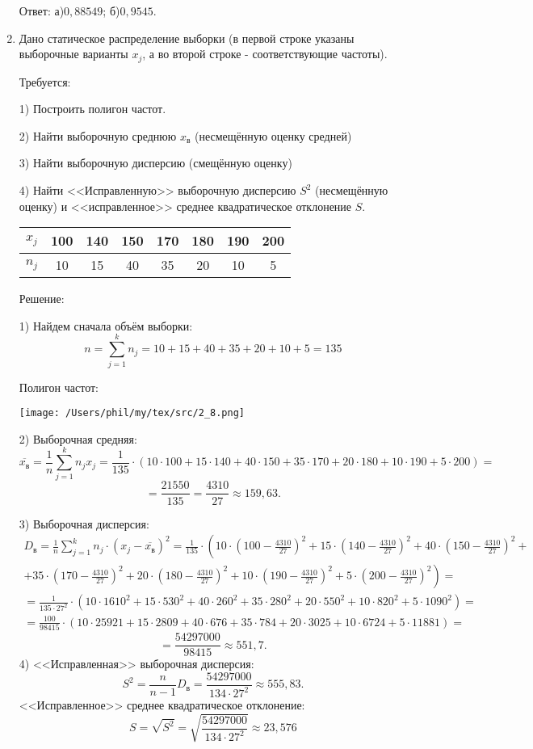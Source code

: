 \documentclass{article}
\begin{document}
\begin{enumerate}
Ответ: а)$0,88549$; б)$0,9545$.

\item %
Дано статическое распределение выборки (в первой строке указаны выборочные варианты $x_j$, а во второй строке - соответствующие частоты).

Требуется:

1) Построить полигон частот.

2) Найти выборочную среднюю $x_\textit{в}$ (несмещённую оценку средней)

3) Найти выборочную дисперсию (смещённую оценку)

4) Найти <<Исправленную>> выборочную дисперсию $S^2$ (несмещённую оценку) и <<исправленное>> среднее квадратическое отклонение $S$.

\begin{center}
\begin{tabular}{|c|c|c|c|c|c|c|c|}
\hline
$x_j$ & 100 & 140 & 150 & 170 & 180 & 190 & 200 \\
\hline
$n_j$ & 10 & 15 & 40 & 35 & 20 & 10 & 5 \\
\hline
\end{tabular}
\end{center}
\begin{center}Решение:\end{center}
1) Найдем сначала объём выборки: $$n=\sum_{j=1}^k n_j=10+15+40+35+20+10+5=135$$

Полигон частот:

\texttt{[image: /Users/phil/my/tex/src/2\_8.png]}

2) Выборочная средняя:
$$\overline{x_\textit{в}}=\frac{1}{n}\sum_{j=1}^k n_j x_j=\frac{1}{135}\cdot\left(10\cdot100+15\cdot140+40\cdot150+35\cdot170+20\cdot180+10\cdot190+5\cdot200\right)=$$
$$=\frac{21550}{135}=\frac{4310}{27}\approx159,63.$$

3) Выборочная дисперсия:
\begin{multline*}
D_{\textit{в}}=\frac{1}{n}\sum_{j=1}^k n_j
\cdot\left(x_j-\overline{x_\textit{в}}\right)^2=
\frac{1}{135}\cdot\left(10\cdot\left(100-\frac{4310}{27}\right)^2+15\cdot\left(140-\frac{4310}{27}\right)^2+40\cdot\left(150-\frac{4310}{27}\right)^2+\right.\\
+\left.35\cdot\left(170-\frac{4310}{27}\right)^2+20\cdot\left(180-\frac{4310}{27}\right)^2+10\cdot\left(190-\frac{4310}{27}\right)^2+5\cdot\left(200-\frac{4310}{27}\right)^2\right)=\\
=\frac{1}{135\cdot27^2}\cdot\left(10\cdot1610^2+15\cdot530^2+40\cdot260^2+35\cdot280^2+20\cdot550^2+10\cdot820^2+5\cdot1090^2\right)=\\
=\frac{100}{98415}\cdot\left(10\cdot25921+15\cdot2809+40\cdot676+35\cdot784+20\cdot3025+10\cdot6724+5\cdot11881\right)=
\end{multline*}
$$=\frac{54297000}{98415}\approx551,7.$$
4) <<Исправленная>> выборочная дисперсия:
$$S^2=\frac{n}{n-1}D_{\textit{в}}=\frac{54297000}{134\cdot27^2}\approx555,83.$$
<<Исправленное>> среднее квадратическое отклонение:
$$S=\sqrt{S^2}=\sqrt{\frac{54297000}{134\cdot27^2}}\approx23,576$$


\end{enumerate}
\end{document}
